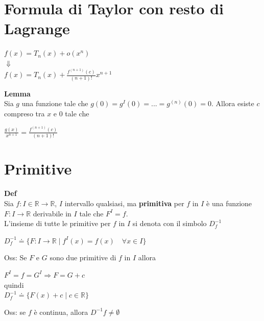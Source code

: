 \documentclass[12pt, a4paper]{article}
\begin{document}
    \section{Formula di Taylor con resto di Lagrange}
    \begin{center}
        $f(x)=T_{n}(x)+o(x^{n})$\\
        $\Downarrow$\\
        $f(x)=T_{n}(x)+\frac{f^{(n+1)}(c)}{(n+1)!}x^{n+1}$
    \end{center}

    \textbf{Lemma}\\Sia $g$ una funzione tale che $g(0)=g^{I}(0)=...=g^{(n)}(0)=0$. Allora esiste $c$ compreso tra $x$
    e $0$ tale che
    \begin{center}
        $\frac{g(x)}{x^{n+1}}=\frac{f^{(n+1)}(c)}{(n+1)!}$
    \end{center}

    \newpage
    \section{Primitive}
    \textbf{Def}\\Sia $f:I\in\mathbb{R}\to\mathbb{R}$, $I$ intervallo qualsiasi, ma \textbf{primitiva} per $f$ in $I$
    è una funzione $F:I\to\mathbb{R}$ derivabile in $I$ tale che $F^{I}=f$.\\L'insieme di tutte le primitive per $f$
    in $I$ si denota con il simbolo $D_{f}^{-1}$
    \begin{center}
        $D_{f}^{-1}\doteq\{F:I\to\mathbb{R}\mid f^{I}(x)=f(x)\quad\forall x\in I\}$
    \end{center}

    Oss: Se $F$ e $G$ sono due primitive di $f$ in $I$ allora
    \begin{center}
        $F^{I}=f=G^{I}\Rightarrow F=G+c$   \\
        quindi\\
        $D_{f}^{-1}\doteq\{F(x)+c\mid c\in\mathbb{R}\}$
    \end{center}

    Oss: se $f$ è continua, allora $D^{-1}f\neq\emptyset$
\end{document}
